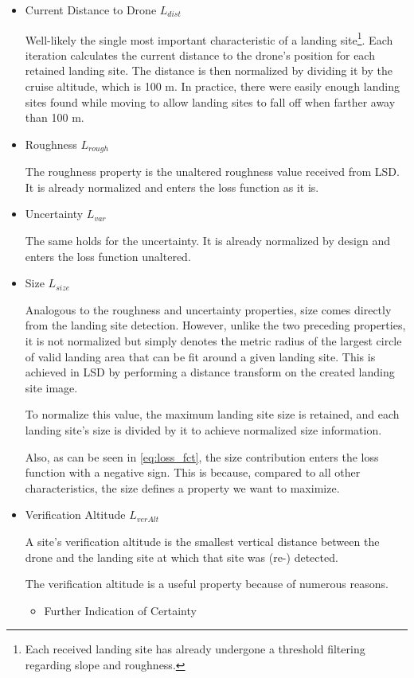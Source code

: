 \begin{itemize}
    \item Current Distance to Drone $L_{dist}$

    Well-likely the single most important characteristic of a landing site\footnote[2]{Each received landing site has already undergone a threshold filtering regarding slope and roughness.}. Each iteration calculates the current distance to the drone's position for each retained landing site. The distance is then normalized by dividing it by the cruise altitude, which is 100 m. In practice, there were easily enough landing sites found while moving to allow landing sites to fall off when farther away than 100 m.
    \item Roughness $L_{rough}$

    The roughness property is the unaltered roughness value received from LSD. It is already normalized and enters the loss function as it is. 
    \item Uncertainty $L_{var}$

    The same holds for the uncertainty. It is already normalized by design and enters the loss function unaltered.
    \item Size $L_{size}$

    Analogous to the roughness and uncertainty properties, size comes directly from the landing site detection. However, unlike the two preceding properties, it is not normalized but simply denotes the metric radius of the largest circle of valid landing area that can be fit around a given landing site. This is achieved in LSD by performing a distance transform on the created landing site image.

    To normalize this value, the maximum landing site size is retained, and each landing site's size is divided by it to achieve normalized size information.

    Also, as can be seen in \cref{eq:loss_fct}, the size contribution enters the loss function with a negative sign. This is because, compared to all other characteristics, the size defines a property we want to maximize.
    \item Verification Altitude $L_{verAlt}$

    A site's verification altitude is the smallest vertical distance between the drone and the landing site at which that site was (re-) detected. 

    The verification altitude is a useful property because of numerous reasons.
    \begin{itemize}
        \item Further Indication of Certainty


\end{itemize}
\end{itemize}
